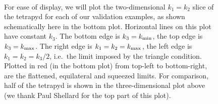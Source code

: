 \begin{figure}[!pth]
\centering
    \\
\caption{
    For ease of display, we will plot the two-dimensional $k_1=k_2$ slice of the tetrapyd
    for each of our validation examples, as shown schematically here in the bottom plot.
    Horizontal lines on this plot have
    constant $k_3$. The bottom edge is $k_3={k_\text{min}}$, the top
    edge is $k_3={k_\text{max}}$. The right edge is $k_1=k_2={k_\text{max}}$, the
    left edge is $k_1=k_2=k_3/2$, i.e.\ the limit imposed by the triangle condition.
    Plotted in red (in the bottom plot) from top-left to bottom-right,
    are the flattened, equilateral and squeezed limits. For comparison,
    half of the tetrapyd is shown in the three-dimensional plot above
    (we thank Paul Shellard for the top part of this plot).
}\label{slice_explained}
\end{figure}


